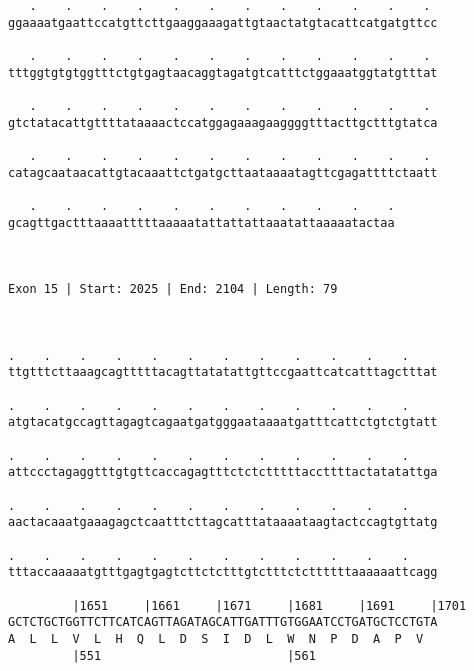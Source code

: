 \documentclass{article}
\begin{document}
\begin{Verbatim}
   .    .    .    .    .    .    .    .    .    .    .    . 
ggaaaatgaattccatgttcttgaaggaaagattgtaactatgtacattcatgatgttcc
                                                            
   .    .    .    .    .    .    .    .    .    .    .    . 
tttggtgtgtggtttctgtgagtaacaggtagatgtcatttctggaaatggtatgtttat
                                                            
   .    .    .    .    .    .    .    .    .    .    .    . 
gtctatacattgttttataaaactccatggagaaagaaggggtttacttgctttgtatca
                                                            
   .    .    .    .    .    .    .    .    .    .    .    . 
catagcaataacattgtacaaattctgatgcttaataaaatagttcgagattttctaatt
                                                            
   .    .    .    .    .    .    .    .    .    .    .
gcagttgactttaaaatttttaaaaatattattattaaatattaaaaatactaa
                                                      
                                                      
 
Exon 15 | Start: 2025 | End: 2104 | Length: 79



.    .    .    .    .    .    .    .    .    .    .    .    
ttgtttcttaaagcagtttttacagttatatattgttccgaattcatcatttagctttat
                                                            
.    .    .    .    .    .    .    .    .    .    .    .    
atgtacatgccagttagagtcagaatgatgggaataaaatgatttcattctgtctgtatt
                                                            
.    .    .    .    .    .    .    .    .    .    .    .    
attccctagaggtttgtgttcaccagagtttctctctttttaccttttactatatattga
                                                            
.    .    .    .    .    .    .    .    .    .    .    .    
aactacaaatgaaagagctcaatttcttagcatttataaaataagtactccagtgttatg
                                                            
.    .    .    .    .    .    .    .    .    .    .    .    
tttaccaaaaatgtttgagtgagtcttctctttgtctttctcttttttaaaaaattcagg
                                                            
         |1651     |1661     |1671     |1681     |1691     |1701
GCTCTGCTGGTTCTTCATCAGTTAGATAGCATTGATTTGTGGAATCCTGATGCTCCTGTA
A  L  L  V  L  H  Q  L  D  S  I  D  L  W  N  P  D  A  P  V  
         |551                          |561                 
  

\end{Verbatim}
\end{document}
